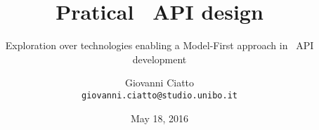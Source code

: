 \documentclass{beamer}
\title{Pratical \restful\ API design}
\subtitle{Exploration over technologies enabling a Model-First approach in \restful\ API development}
\author[G. Ciatto]{Giovanni Ciatto \\ \texttt{giovanni.ciatto@studio.unibo.it}}
\date{May 18, 2016}
\institute[UNIBO]{University of Bologna \\ Computer Science and Engineering}
\begin{document}
\frame{\titlepage}












\end{document}

